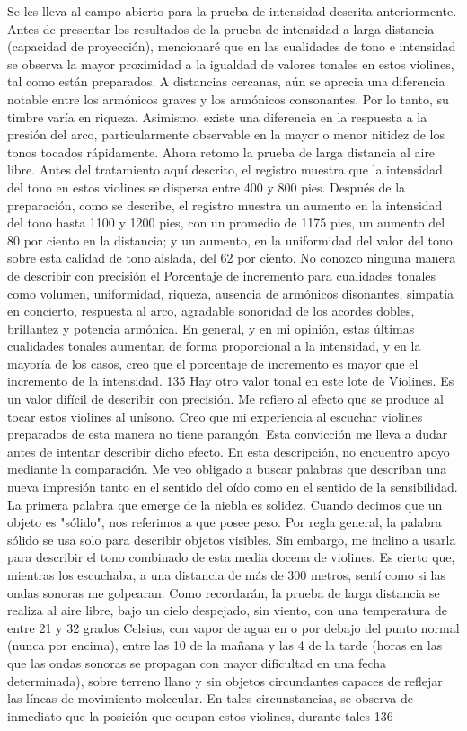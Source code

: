 Se les lleva al campo abierto para la prueba de intensidad descrita anteriormente. Antes de presentar los resultados de la prueba de intensidad a larga distancia (capacidad de proyección), mencionaré que en las cualidades de tono e intensidad se observa la mayor proximidad a la igualdad de valores tonales en estos violines, tal como están preparados. A distancias cercanas, aún se aprecia una diferencia notable entre los armónicos graves y los armónicos consonantes. Por lo tanto, su timbre varía en riqueza. Asimismo, existe una diferencia en la respuesta a la presión del arco, particularmente observable en la mayor o menor nitidez de los tonos tocados rápidamente.
Ahora retomo la prueba de larga distancia al aire libre. Antes del tratamiento aquí descrito, el registro muestra que la intensidad del tono en estos violines se dispersa entre 400 y 800 pies. Después de la preparación, como se describe, el registro muestra un aumento en la intensidad del tono hasta 1100 y 1200 pies, con un promedio de 1175 pies, un aumento del 80 por ciento en la distancia; y un aumento, en la uniformidad del valor del tono sobre esta calidad de tono aislada, del 62 por ciento. No conozco ninguna manera de describir con precisión el
Porcentaje de incremento para cualidades tonales como volumen, uniformidad, riqueza, ausencia de armónicos disonantes, simpatía en concierto, respuesta al arco, agradable sonoridad de los acordes dobles, brillantez y potencia armónica. En general, y en mi opinión, estas últimas cualidades tonales aumentan de forma proporcional a la intensidad, y en la mayoría de los casos, creo que el porcentaje de incremento es mayor que el incremento de la intensidad.
135
\label{efecto_tonal}
Hay otro valor tonal en este lote de
Violines. Es un valor difícil de describir con precisión. Me refiero al efecto que se produce al tocar estos violines al unísono. Creo que mi experiencia al escuchar violines preparados de esta manera no tiene parangón. Esta convicción me lleva a dudar antes de intentar describir dicho efecto. En esta descripción, no encuentro apoyo mediante la comparación. Me veo obligado a buscar palabras que describan una nueva impresión tanto en el sentido del oído como en el sentido de la sensibilidad.
La primera palabra que emerge de la niebla es solidez. Cuando decimos que un objeto es "sólido", nos referimos a que posee peso. Por regla general, la palabra sólido se usa solo para describir objetos visibles. Sin embargo, me inclino a usarla para describir el tono combinado de esta media docena de violines. Es cierto que, mientras los escuchaba, a una distancia de más de 300 metros, sentí como si las ondas sonoras me golpearan. Como recordarán, la prueba de larga distancia se realiza al aire libre, bajo un cielo despejado, sin viento, con una temperatura de entre 21 y 32 grados Celsius, con vapor de agua en o por debajo del punto normal (nunca por encima), entre las 10 de la mañana y las 4 de la tarde (horas en las que las ondas sonoras se propagan con mayor dificultad en una fecha determinada), sobre terreno llano y sin objetos circundantes capaces de reflejar las líneas de movimiento molecular. En tales circunstancias, se observa de inmediato que la posición que ocupan estos violines, durante tales
136

